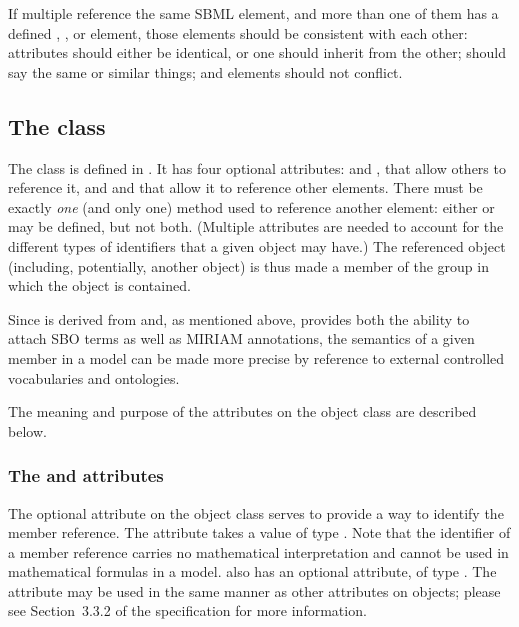 If multiple \ListOfMembers reference the same SBML element, and more than one of them has a defined , \Notes, or \Annotation element, those elements should be consistent with each other:   attributes should either be identical, or one should inherit from the other; \Notes should say the same or similar things; and \Annotation elements should not conflict.


\subsection{The  class}
\label{member-class}

The \Member class is defined in .  It has four optional attributes:  and , that allow others to reference it, and  and  that allow it to reference other elements.  There must be exactly \emph{one} (and only one) method used to reference another element: either  or  may be defined, but not both.  (Multiple attributes are needed to account for the different types of identifiers that a given object may have.)  The referenced object (including, potentially, another \Group object) is thus made a member of the group in which the \Member object is contained.

Since \Member is derived from \SBase and, as mentioned above, \SBase provides both the ability to attach SBO terms as well as MIRIAM annotations, the semantics of a given member in a model can be made more precise by reference to external controlled vocabularies and ontologies.

The meaning and purpose of the attributes on the object class are described below.


\subsubsection{The \fixttspace{} and \fixttspace{} attributes}
\label{member-idname-attributes}

The optional  attribute on the \Member object class serves to provide a way to identify the member reference.  The attribute takes a value of type .  Note that the identifier of a member reference carries no mathematical interpretation and cannot be used in mathematical formulas in a model.  \Member also has an optional  attribute, of type .  The  attribute may be used in the same manner as other  attributes on \sbmlthreecore objects; please see Section~3.3.2 of the \sbmlthreecore specification for more information.


